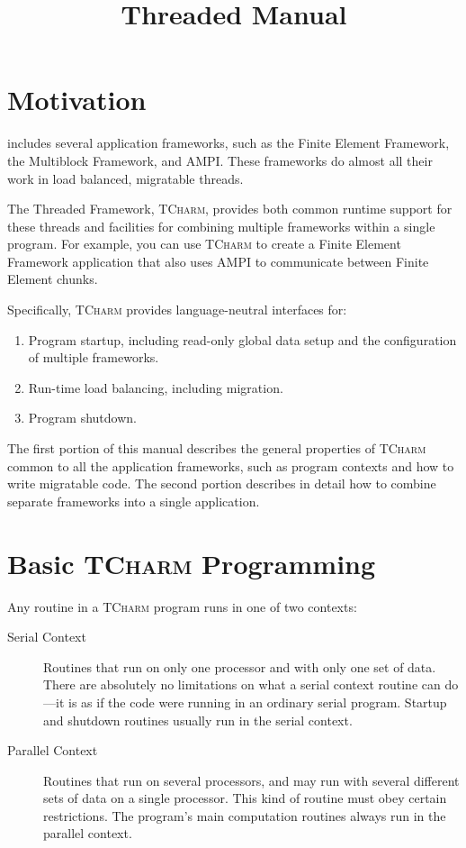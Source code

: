 \documentclass[10pt]{article}
\title{Threaded \charmpp Manual}
\newcommand{\tcharm}{\textsc{TCharm}}
\begin{document}
\maketitle

\section{Motivation}

\charmpp{} includes several application frameworks, such as the 
Finite Element Framework, the Multiblock Framework, and AMPI.  
These frameworks do almost all their work in load balanced, 
migratable threads.  

The Threaded \charmpp{} Framework, \tcharm{}, provides both
common runtime support for these threads and facilities for
combining multiple frameworks within a single program.
For example, you can use \tcharm{} to create a Finite Element
Framework application that also uses AMPI to communicate between
Finite Element chunks.

Specifically, \tcharm{} provides language-neutral interfaces for:
\begin{enumerate}
\item{Program startup, including read-only global data setup and the
configuration of multiple frameworks.}
\item{Run-time load balancing, including migration.}
\item{Program shutdown.}
\end{enumerate}

The first portion of this manual describes the general properties 
of \tcharm{} common to all the application frameworks, such as 
program contexts and how to write migratable code.
The second portion describes in detail how to combine separate 
frameworks into a single application.


\section{Basic \tcharm{} Programming}
Any routine in a \tcharm{} program runs in one of two contexts:

\begin{description}

\item[Serial Context] Routines that run on only one processor
and with only one set of data. There are absolutely
no limitations on what a serial context routine can do---it 
is as if the code were running in an ordinary serial program.
Startup and shutdown routines usually run in the serial context.

\item[Parallel Context] Routines that run on several processors,
and may run with several different sets of data on a single processor.
This kind of routine must obey certain restrictions.  The program's
main computation routines always run in the parallel context.

\end{description}
\end{document}
